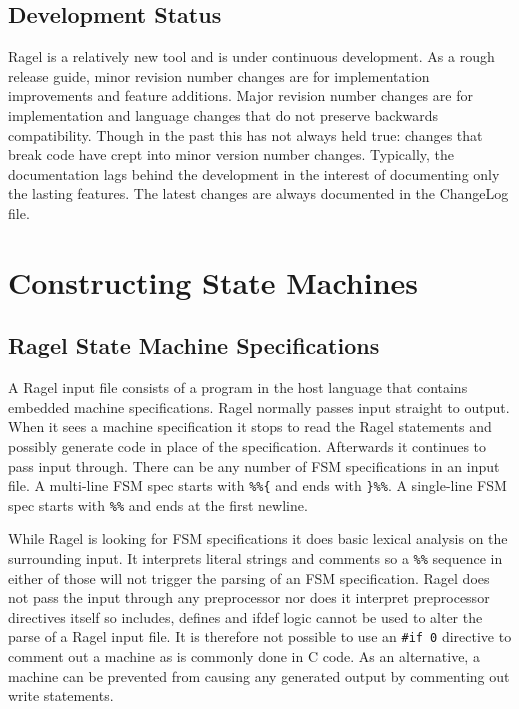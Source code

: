 \documentclass[letterpaper,11pt,oneside]{book}
\begin{document}
\section{Development Status}

Ragel is a relatively new tool and is under continuous development. As a rough
release guide, minor revision number changes are for implementation
improvements and feature additions. Major revision number changes are for
implementation and language changes that do not preserve backwards
compatibility. Though in the past this has not always held true: changes that
break code have crept into minor version number changes. Typically, the
documentation lags behind the development in the interest of documenting only
the lasting features. The latest changes are always documented in the ChangeLog
file. 

\chapter{Constructing State Machines}

\section{Ragel State Machine Specifications}

A Ragel input file consists of a program in the host language that contains embedded machine
specifications.  Ragel normally passes input straight to output.  When it sees
a machine specification it stops to read the Ragel statements and possibly generate
code in place of the specification.
Afterwards it continues to pass input through.  There
can be any number of FSM specifications in an input file. A multi-line FSM spec
starts with \verb|%%{| and ends with \verb|}%%|. A single-line FSM spec starts
with \verb|%%| and ends at the first newline.  

While Ragel is looking for FSM specifications it does basic lexical analysis on
the surrounding input. It interprets literal strings and comments so a
\verb|%%| sequence in either of those will not trigger the parsing of an FSM
specification. Ragel does not pass the input through any preprocessor nor does it
interpret preprocessor directives itself so includes, defines and ifdef logic
cannot be used to alter the parse of a Ragel input file. It is therefore not
possible to use an \verb|#if 0| directive to comment out a machine as is
commonly done in C code. As an alternative, a machine can be prevented from
causing any generated output by commenting out write statements.
\end{document}

